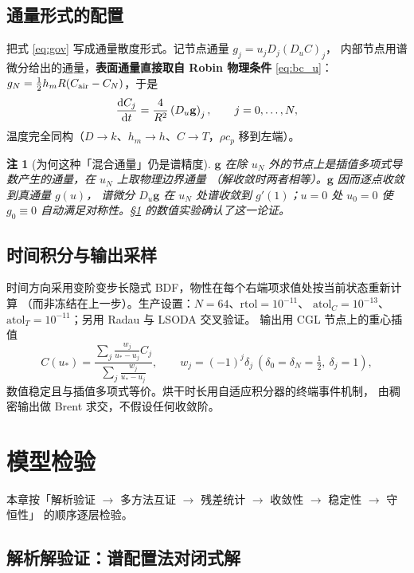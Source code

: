 \documentclass[bwprint]{cumcmthesis}
\newtheorem{remark}{注}
\begin{document}
\subsection{通量形式的配置}

把式 \eqref{eq:gov} 写成通量散度形式。记节点通量 $g_j=u_jD_j(D_uC)_j$，
内部节点用谱微分给出的通量，\textbf{表面通量直接取自 Robin 物理条件} \eqref{eq:bc_u}：
$g_N=\frac12h_mR(C_{\rm air}-C_N)$，于是
\begin{equation}
\frac{{\rm d}C_j}{{\rm d}t}=\frac{4}{R^2}\left(D_u\mathbf{g}\right)_j,\qquad j=0,\dots,N,
\end{equation}
温度完全同构（$D\to k$、$h_m\to h$、$C\to T$，$\rho c_p$ 移到左端）。

\begin{remark}[为何这种「混合通量」仍是谱精度]
$\mathbf g$ 在除 $u_N$ 外的节点上是插值多项式导数产生的通量，在 $u_N$ 上取物理边界通量
（解收敛时两者相等）。$\mathbf g$ 因而逐点收敛到真通量 $g(u)$，
谱微分 $D_u\mathbf g$ 在 $u_N$ 处谱收敛到 $g'(1)$；$u=0$ 处 $u_0=0$ 使 $g_0\equiv0$
自动满足对称性。\S\ref{sec:verify} 的数值实验确认了这一论证。
\end{remark}

\subsection{时间积分与输出采样}

时间方向采用变阶变步长隐式 BDF，物性在每个右端项求值处按当前状态重新计算
（而非冻结在上一步）。生产设置：$N=64$、$\mathrm{rtol}=10^{-11}$、
$\mathrm{atol}_C=10^{-13}$、$\mathrm{atol}_T=10^{-11}$；另用 Radau 与 LSODA 交叉验证。
输出用 CGL 节点上的重心插值
\[
C(u_*)=\frac{\sum_j\frac{w_j}{u_*-u_j}C_j}{\sum_j\frac{w_j}{u_*-u_j}},
\qquad w_j=(-1)^j\delta_j\ (\delta_0=\delta_N=\tfrac12,\ \delta_j=1),
\]
数值稳定且与插值多项式等价。烘干时长用自适应积分器的终端事件机制，
由稠密输出做 Brent 求交，不假设任何收敛阶。

\section{模型检验}
\label{sec:verify}

本章按「解析验证 $\to$ 多方法互证 $\to$ 残差统计 $\to$ 收敛性 $\to$ 稳定性 $\to$ 守恒性」
的顺序逐层检验。

\subsection{解析解验证：谱配置法对闭式解}
\end{document}
